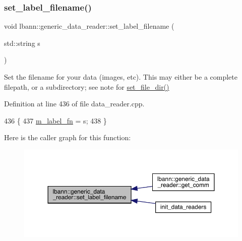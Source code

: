 \subsubsection{\texorpdfstring{set\+\_\+label\+\_\+filename()}{set\_label\_filename()}}
{\footnotesize\ttfamily void lbann\+::generic\+\_\+data\+\_\+reader\+::set\+\_\+label\+\_\+filename (\begin{DoxyParamCaption}\item[{std\+::string}]{s }\end{DoxyParamCaption})}

Set the filename for your data (images, etc). This may either be a complete filepath, or a subdirectory; see note for \hyperlink{classlbann_1_1generic__data__reader_a94a6db0b62d4c98202ef309eb76b220c}{set\+\_\+file\+\_\+dir()} 

Definition at line 436 of file data\+\_\+reader.\+cpp.


\begin{DoxyCode}
436                                                         \{
437   \hyperlink{classlbann_1_1generic__data__reader_a492d45c107df31b3e241e54d51950746}{m\_label\_fn} = s;
438 \}
\end{DoxyCode}
Here is the caller graph for this function\+:\nopagebreak
\begin{figure}[H]
\begin{center}
\leavevmode
\includegraphics[width=350pt]{classlbann_1_1generic__data__reader_af45f301cc9adc2f8184b81d8d2600b8f_icgraph}
\end{center}
\end{figure}
\mbox{\label{classlbann_1_1generic__data__reader_a357389ee93428b68f9400de708f6915d}} 
